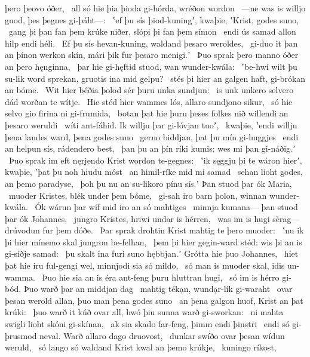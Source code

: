 þero þeovo óðer, \hld\ all só hie þia þioda gi-hórda,
wréðon wordon \hld\ —ne was is willjo guod,
þes þegnes gi-þáht—: \hld\ ʽef þu sís þiod-kuningʼ, kwaþie,
ʽKrist, godes suno, \hld\ gang þi þan fan þem krúke niðer,
slópi þi fan þem símon \hld\ endi ús samad allon
hilp endi héli. \hld\ Ef þu sís hevan-kuning,
waldand þesaro weroldes, \hld\ gi-duo it þan an þínon werkon skín,
mári þik fur þesaro menigi.ʼ \hld\ Þuo sprak þero manno óðer
an þero hęnginna, \hld\ þar hie gi-hęftid stuod,
wan wunder-kwála: \hld\ ʽbe-hwí wilt þu su-lik word sprekan,
gruotis ina mid gelpu? \hld\ stés þi hier an galgen haft,
gi-brókan an bóme. \hld\ Wit hier béðia þolod
sér þuru unka sundjun: \hld\ is unk unkero selvero dád
worðan te wítje. \hld\ Hie stéd hier wammes lós,
allaro sundjono sikur, \hld\ só hie selvo gio
firina ni gi-frumida, \hld\ botan þat hie þuru þeses folkes nið
willendi an þesaro weruldi \hld\ wíti ant-fáhid.
Ik willju þar gi-lóvjan tuoʼ, \hld\ kwaþie, ʽendi willju þena landes ward,
þena godes suno \hld\ gerno biddjan,
þat þu mín gi-huggjes \hld\ endi an helpun sís,
rádendero best, \hld\ þan þu an þín ríki kumis:
wes mi þan gi-náðig.ʼ \hld\ Þuo sprak im eft nęrjendo Krist
wordon te-gegnes: \hld\ ʽik sęggju þi te wáron hierʼ, kwaþie,
ʽþat þu noh hiudu móst \hld\ an himil-ríke
mid mi samad \hld\ sehan lioht godes,
an þemo paradyse, \hld\ þoh þu nu an su-likoro pínu sís.ʼ
Þan stuod þar ók Maria, \hld\ muoder Kristes,
blék under þem bóme, \hld\ gi-sah iro barn þolon,
winnan wunder-kwála. \hld\ Ók wárun þar wíf mid iro
an só mahtiges \hld\ minnja kumana—
þan stuod þar ók Johannes, \hld\ jungro Kristes,
hriwi undar is hérren, \hld\ was im is hugi sèrag—
drúvodun fur þem dóðe. \hld\ Þar sprak drohtin Krist
mahtig te þero muoder: \hld\ ʽnu ik þi hier mínemo skal
jungron be-felhan, \hld\ þem þi hier gegin-ward stéd:
wis þi an is gi-síðje samad: \hld\ þu skalt ina furi suno hębbjan.ʼ
Grótta hie þuo Johannes, \hld\ hiet þat hie iru ful-gengi wel,
minnjodi sia só mildo, \hld\ só man is muoder skal,
idis un-wamma. \hld\ Þuo hie sia an is éra ant-feng
þuru hluttran hugi, \hld\ só im is hérro gi-bód.
Þuo warð þar an middjan dag \hld\ mahtig tékạn,
wundạr-lík gi-waraht \hld\ ovar þesan werold allan,
þuo man þena godes suno \hld\ an þena galgon huof,
Krist an þat krúki: \hld\ þuo warð it kúð ovar all,
hwó þiu sunna warð gi-sworkan: \hld\ ni mahta swigli lioht
skóni gi-skínan, \hld\ ak sia skado far-feng,
þimm endi þiustri \hld\ endi só gi-þrusmod neval.
Warð allaro dago druovost, \hld\ dunkar swíðo
ovar þesan wídun weruld, \hld\ só lango só waldand Krist
kwal an þemo krúkje, \hld\ kuningo ríkost,
